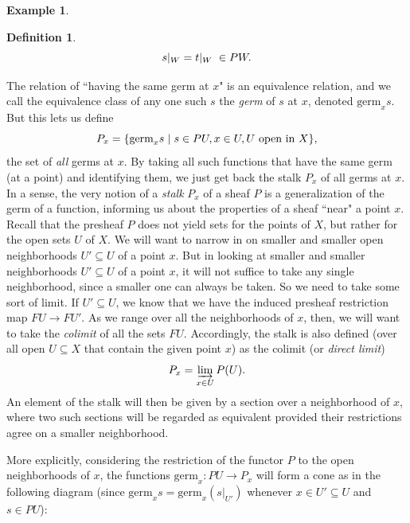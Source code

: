 \documentclass[11pt]{book}
\theoremstyle{definition}
\newtheorem{example}{Example}[section]
\theoremstyle{definition}
\newtheorem{definition}{Definition}[section]
\theoremstyle{definition}
\theoremstyle{theorem}
\theoremstyle{definition}
\begin{document}
\begin{example}
\begin{definition}
	\begin{equation*} 
	s|_{W} = t|_{W} \hspace*{0.3em }\in PW.
	\end{equation*} 
	\end{definition} \noindent 
	The relation of ``having the same germ at $x$" is an equivalence relation, and we call the equivalence class of any one such $s$ the \textit{germ} of $s$ at $x$, denoted $\text{germ}_x s$. But this lets us define
	\begin{equation}
	P_x = \{\text{germ}_x s \hspace*{0.3em}| \hspace*{0.3em} s \in PU, x \in U, U \text{ open in } X\},
	\end{equation} 
	the set of \textit{all} germs at $x$. By taking all such functions that have the same germ (at a point) and identifying them, we just get back the stalk $P_x$ of all germs at $x$. In a sense, the very notion of a \textit{stalk} $P_x$ of a sheaf $P$ is a generalization of the germ of a function, informing us about the properties of a sheaf ``near" a point $x$. Recall that the presheaf $P$ does not yield sets for the points of $X$, but rather for the open sets $U$ of $X$. We will want to narrow in on smaller and smaller open neighborhoods $U' \subseteq  U$ of a point $x$. But in looking at smaller and smaller neighborhoods $U' \subseteq  U$ of a point $x$, it will not suffice to take any single neighborhood, since a smaller one can always be taken. So we need to take some sort of limit. If $U' \subseteq  U$, we know that we have the induced presheaf restriction map $FU \rightarrow FU'$. As we range over all the neighborhoods of $x$, then, we will want to take the \textit{colimit} of all the sets $FU$. Accordingly, the stalk is also defined (over all open $U \subseteq  X$ that contain the given point $x$) as the colimit (or \textit{direct limit})
	\begin{equation}
	P_x = \varinjlim_{x \in U} P(U).
	\end{equation} 
	An element of the stalk will then be given by a section over a neighborhood of $x$, where two such sections will be regarded as equivalent provided their restrictions agree on a smaller neighborhood. \par 
	More explicitly, considering the restriction of the functor $P$ to the open neighborhoods of $x$, the functions $\text{germ}_x: PU \rightarrow P_x$ will form a cone as in the following diagram (since $\text{germ}_x s = \text{germ}_x (s|_{U'})$ whenever $x \in U' \subseteq U$ and $s \in PU$): 

\end{example}
\end{document}
